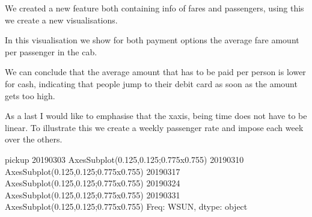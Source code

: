 \documentclass[letterpaper,10pt,english]{jupyterBook}
\begin{document}
\sphinxAtStartPar
We created a new feature both containing info of fares and passengers, using this we create a new visualisations.

\sphinxAtStartPar
In this visualisation we show for both payment options the average fare amount per passenger in the cab.

\begin{sphinxVerbatim}[commandchars=\\\{\}]
   
\end{sphinxVerbatim}

\noindent{}

\sphinxAtStartPar
We can conclude that the average amount that has to be paid per person is lower for cash, indicating that people jump to their debit card as soon as the amount gets too high.

\sphinxAtStartPar
As a last I would like to emphasise that the x\sphinxhyphen{}axis, being time does not have to be linear.
To illustrate this we create a weekly passenger rate and impose each week over the others.

\begin{sphinxVerbatim}[commandchars=\\\{\}]
       
\end{sphinxVerbatim}

\begin{sphinxVerbatim}[commandchars=\\\{\}]
pickup
2019\PYGZhy{}03\PYGZhy{}03    AxesSubplot(0.125,0.125;0.775x0.755)
2019\PYGZhy{}03\PYGZhy{}10    AxesSubplot(0.125,0.125;0.775x0.755)
2019\PYGZhy{}03\PYGZhy{}17    AxesSubplot(0.125,0.125;0.775x0.755)
2019\PYGZhy{}03\PYGZhy{}24    AxesSubplot(0.125,0.125;0.775x0.755)
2019\PYGZhy{}03\PYGZhy{}31    AxesSubplot(0.125,0.125;0.775x0.755)
Freq: W\PYGZhy{}SUN, dtype: object
\end{sphinxVerbatim}
\end{document}
